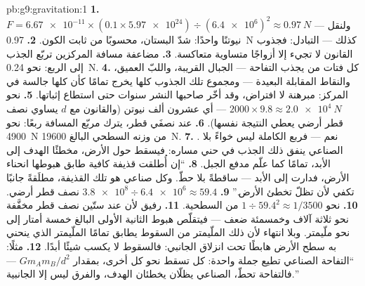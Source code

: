 \begin{solution}{pb:g9:gravitation:1}
\textbf{1.} $F = \num{6.67e-11} \times (0.1 \times
\num{5.97e24}) \div (\num{6.4e6})^2 \approx \qty{0.97}{N}$
--- ولنقل نيوتنًا واحدًا: شدّ البستان، محسوبًا من ثابت
الكون.
\textbf{2.} \qty{0.97}{N} كذلك --- التبادل: فجذوب القانون لا
تجيء إلا أزواجًا متساوية متعاكسة.
\textbf{3.} مضاعفة مسافة المركزين تربّع الجذب إلى الربع: نحو
\qty{0.24}{N}.
\textbf{4.} كل فتات من  يجذب التفاحة --- الجبال
القريبة، واللبّ العميق، والنقاط المقابلة البعيدة --- ومجموع
تلك الجذوب كلها يخرج تمامًا كأن  كلها جالسة في المركز:
مبرهنة لا افتراض، وقد أخّر صاحبها النشر سنوات حتى استطاع
إثباتها.
\textbf{5.} نحو $2000 \times 9.8 \approx \qty{2.0e4}{N}$ ---
أي عشرون ألف نيوتن (والقانون مع $d$ يساوي نصف قطر أرضي يعطي
النتيجة نفسها).
\textbf{6.} عند نصفَي قطر، يترك مربّع المسافة ربعًا: نحو
\qty{4900}{N} من وزنه السطحي البالغ \qty{19600}{N}.
\textbf{7.} نعم --- فربع  الكاملة ليس خواءً بلا .
 الصناعي ينفق ذلك الجذب في حني مساره: فيسقط حول الأرض،
مخطئًا الهدف إلى الأبد، تمامًا كما علّم مدفع الجبل.
\textbf{8.} ``إن أُطلقت قذيفة  كافية طابق هبوطها انحناء
الأرض، فدارت إلى الأبد --- ساقطةً بلا حطّ. وكل  صناعي هو
تلك القذيفة، مطلَقةً جانبًا  تكفي لأن تظلّ تخطئ الأرض.''
\textbf{9.} $\num{3.8e8} \div \num{6.4e6} \approx 59.4$ نصف
قطر أرضي.
\textbf{10.} نحو $1 \div 59.4^2 \approx 1/3500$ من 
السطحية.
\textbf{11.} رفيق لأن  عند ستّين نصف قطر مخفَّفة نحو
ثلاثة آلاف وخمسمئة ضعف --- فيتقلّص هبوط الثانية الأولى البالغ
خمسة أمتار إلى نحو ملّيمتر. وبلا انتهاء لأن ذلك الملّيمتر من
السقوط يطابق تمامًا الملّيمتر الذي ينحني به سطح الأرض هابطًا
تحت انزلاق  الجانبي: فالسقوط لا يكسب شيئًا أبدًا.
\textbf{12.} مثلًا: ``التفاحة  الصناعي  تطيع جملة
واحدة: كل  تسقط نحو كل  أخرى، بمقدار
$G m_A m_B / d^2$ --- فالتفاحة تحطّ،  الصناعي 
يظلّان يخطئان الهدف، والفرق ليس إلا  الجانبية.''
\end{solution}
